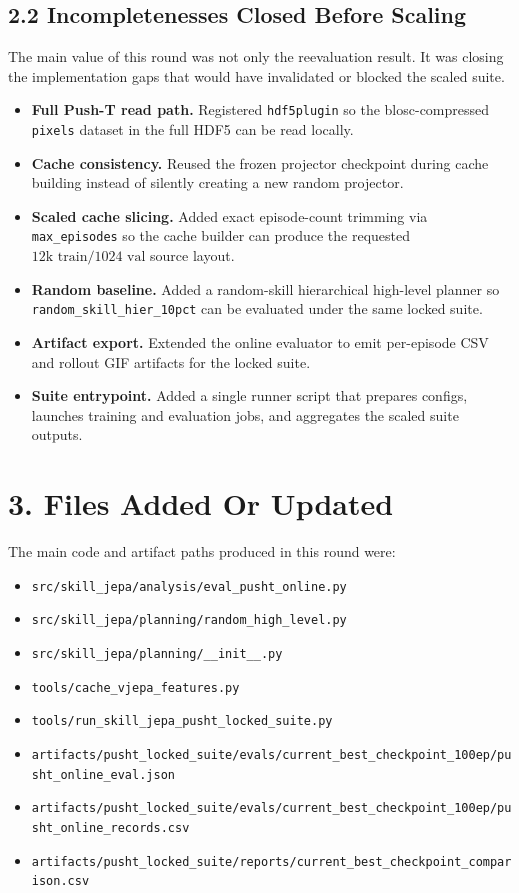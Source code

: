 \documentclass[11pt]{article}
\begin{document}
\subsection*{2.2 Incompletenesses Closed Before Scaling}

The main value of this round was not only the reevaluation result.
It was closing the implementation gaps that would have invalidated or blocked the scaled suite.

\begin{itemize}
\item \textbf{Full Push-T read path.} Registered \texttt{hdf5plugin} so the blosc-compressed \texttt{pixels} dataset in the full HDF5 can be read locally.
\item \textbf{Cache consistency.} Reused the frozen projector checkpoint during cache building instead of silently creating a new random projector.
\item \textbf{Scaled cache slicing.} Added exact episode-count trimming via \texttt{max\_episodes} so the cache builder can produce the requested \(12\text{k train} / 1024\text{ val}\) source layout.
\item \textbf{Random baseline.} Added a random-skill hierarchical high-level planner so \texttt{random\_skill\_hier\_10pct} can be evaluated under the same locked suite.
\item \textbf{Artifact export.} Extended the online evaluator to emit per-episode CSV and rollout GIF artifacts for the locked suite.
\item \textbf{Suite entrypoint.} Added a single runner script that prepares configs, launches training and evaluation jobs, and aggregates the scaled suite outputs.
\end{itemize}

\section*{3. Files Added Or Updated}

The main code and artifact paths produced in this round were:

\begin{itemize}
\item \texttt{src/skill\_jepa/analysis/eval\_pusht\_online.py}
\item \texttt{src/skill\_jepa/planning/random\_high\_level.py}
\item \texttt{src/skill\_jepa/planning/\_\_init\_\_.py}
\item \texttt{tools/cache\_vjepa\_features.py}
\item \texttt{tools/run\_skill\_jepa\_pusht\_locked\_suite.py}
\item \texttt{artifacts/pusht\_locked\_suite/evals/current\_best\_checkpoint\_100ep/pusht\_online\_eval.json}
\item \texttt{artifacts/pusht\_locked\_suite/evals/current\_best\_checkpoint\_100ep/pusht\_online\_records.csv}
\item \texttt{artifacts/pusht\_locked\_suite/reports/current\_best\_checkpoint\_comparison.csv}
\end{itemize}
\end{document}
